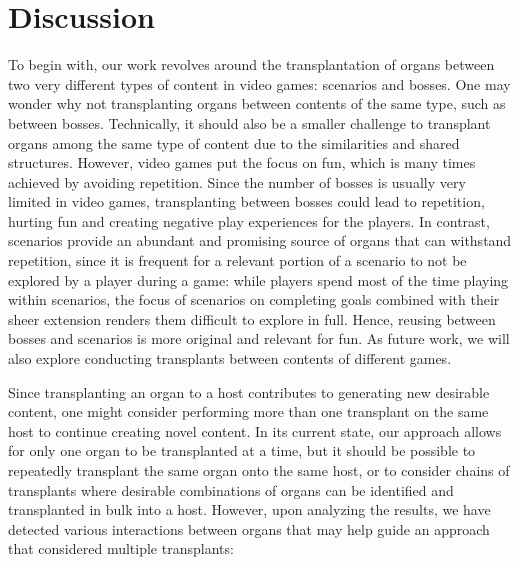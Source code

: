 \section{Discussion}
\label{sec:Discussion}


To begin with, our work revolves around the transplantation of organs between two very different types of content in video games: scenarios and bosses. One may wonder why not transplanting organs between contents of the same type, such as between bosses. Technically, it should also be a smaller challenge to transplant organs among the same type of content due to the similarities and shared structures. However, video games put the focus on fun, which is many times achieved by avoiding repetition. Since the number of bosses is usually very limited in video games, transplanting between bosses could lead to repetition, hurting fun and creating negative play experiences for the players. In contrast, scenarios provide an abundant and promising source of organs that can withstand repetition, since it is frequent for a relevant portion of a scenario to not be explored by a player during a game: while players spend most of the time playing within scenarios, the focus of scenarios on completing goals combined with their sheer extension renders them difficult to explore in full. Hence, reusing between bosses and scenarios is more original and relevant for fun. As future work, we will also explore conducting transplants between contents of different games.

Since transplanting an organ to a host contributes to generating new desirable content, one might consider performing more than one transplant on the same host to continue creating novel content. In its current state, our approach allows for only one organ to be transplanted at a time, but it should be possible to repeatedly transplant the same organ onto the same host, or to consider chains of transplants where desirable combinations of organs can be identified and transplanted in bulk into a host. However, upon analyzing the results, we have detected various interactions between organs that may help guide an approach that considered multiple transplants: 

